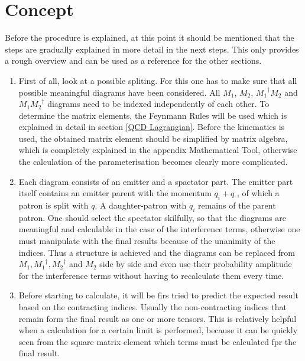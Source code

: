 \section*{Concept}
\label{Concept}
Before the procedure is explained, at this point it should be mentioned that the steps are gradually explained in more detail in the next steps. This only provides a rough overview and can be used as a reference for the other sections.
\\
\renewcommand{\labelenumi}{\roman{enumi})}
\begin{enumerate}
\item First of all, look at a possible spliting. For this one has to make sure that all possible meaningful diagrams have been considered.
All $ M_1 $, $ M_2 $, $ {M_1}^{\dagger} M_2 $ and $ M_1{M_2}^{\dagger}$ diagrams need to be indexed independently of each other.  To determine the matrix elements, the Feynmann Rules will be used which is explained in detail in section \ref{QCD Lagrangian}. Before the kinematics is used, the obtained matrix element should be simplified by matrix algebra, which is completely explained in the appendix Mathematical Tool, otherwise the calculation of the parameterisation becomes clearly more complicated.
\\
\item Each diagram consists of an emitter and a spactator part.
The emitter part itself contains an emitter parent with the momentum $ q_i+q $ , of which a patron is split with $ q $. A daughter-patron with $ q_i $ remains of the parent patron. One should select the spectator skilfully, so that the diagrams are meaningful and calculable in the case of the interference terms, otherwise one must manipulate with the final results because of the unanimity of the indices. Thus a structure is achieved and the diagrams can be replaced from $ M_1, {M_1}^{\dagger}, {M_2}^{\dagger}$ and $ M_2 $ side by side and even use their probability amplitude for the interference terms without having to recalculate them every time. 
\\
\item Before starting to calculate, it will be firs tried to predict the expected result based on the contracting indices. Usually the non-contracting indices that remain form the final result as one or more tensors. This is relatively helpful when a calculation for a certain limit is performed, because it can be quickly seen from the square matrix element which terms must be calculated fpr the final result.
\\

\end{enumerate}
